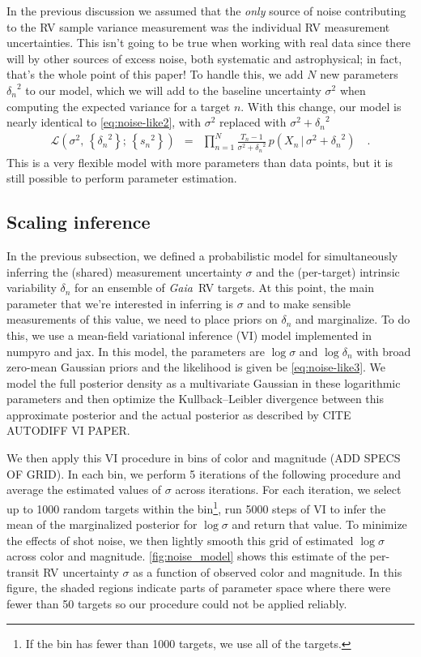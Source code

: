 \documentclass[modern, letterpaper]{aastex631}
\newcommand{\package}[1]{\textsf{#1}}
\newcommand{\project}[1]{\textsl{#1}}
\newcommand{\Gaia}{\project{Gaia}}
\begin{document}
In the previous discussion we assumed that the \emph{only} source of noise contributing to the RV sample variance measurement was the individual RV measurement uncertainties.
This isn't going to be true when working with real data since there will by other sources of excess noise, both systematic and astrophysical; in fact, that's the whole point of this paper!
To handle this, we add $N$ new parameters ${\delta_n}^2$ to our model, which we will add to the baseline uncertainty $\sigma^2$ when computing the expected variance for a target $n$.
With this change, our model is nearly identical to \autoref{eq:noise-like2}, with $\sigma^2$ replaced with $\sigma^2 + {\delta_n}^2$
\begin{eqnarray}
	\label{eq:noise-like3}
	\mathcal{L}(\sigma^2,\,\left\{{\delta_n}^2\right\};\,\left\{{s_n}^2\right\}) &=& \prod_{n=1}^N \frac{T_n - 1}{\sigma^2 + {\delta_n}^2}\,p(X_n\,|\,\sigma^2 + {\delta_n}^2) \quad.
\end{eqnarray}
This is a very flexible model with more parameters than data points, but it is still possible to perform parameter estimation.

\subsection{Scaling inference}

In the previous subsection, we defined a probabilistic model for simultaneously inferring the (shared) measurement uncertainty $\sigma$ and the (per-target) intrinsic variability $\delta_n$ for an ensemble of \Gaia\ RV targets.
At this point, the main parameter that we're interested in inferring is $\sigma$ and to make sensible measurements of this value, we need to place priors on $\delta_n$ and marginalize.
To do this, we use a mean-field variational inference (VI) model implemented in \package{numpyro} and \package{jax}.
In this model, the parameters are $\log \sigma$ and $\log \delta_n$ with broad zero-mean Gaussian priors and the likelihood is given be \autoref{eq:noise-like3}.
We model the full posterior density as a multivariate Gaussian in these logarithmic parameters and then optimize the Kullback--Leibler divergence between this approximate posterior and the actual posterior as described by CITE AUTODIFF VI PAPER.

We then apply this VI procedure in bins of color and magnitude (ADD SPECS OF GRID).
In each bin, we perform 5 iterations of the following procedure and average the estimated values of $\sigma$ across iterations.
For each iteration, we select up to 1000 random targets within the bin\footnote{If the bin has fewer than 1000 targets, we use all of the targets.}, run 5000 steps of VI to infer the mean of the marginalized posterior for $\log \sigma$ and return that value.
To minimize the effects of shot noise, we then lightly smooth this grid of estimated $\log \sigma$ across color and magnitude.
\autoref{fig:noise_model} shows this estimate of the per-transit RV uncertainty $\sigma$ as a function of observed color and magnitude.
In this figure, the shaded regions indicate parts of parameter space where there were fewer than 50 targets so our procedure could not be applied reliably.
\end{document}
